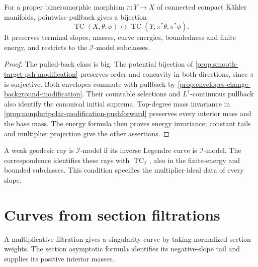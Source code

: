 \begin{proposition}\label{prop:test-curve-modification-invariance}
For a proper bimeromorphic morphism $\pi:Y\to X$ of connected compact K\"ahler manifolds, pointwise pullback gives a bijection
\[
 \operatorname{TC}(X,\theta,\phi)
       \longleftrightarrow
              \operatorname{TC}(Y,\pi^*\theta,\pi^*\phi).
\]
It preserves terminal slopes, masses, curve energies, boundedness and finite energy, and restricts to the $\mathcal I$-model subclasses.
\end{proposition}
\begin{proof}
The pulled-back class is big. The potential bijection of \cref{prop:smooth-target-psh-modification} preserves order and concavity in both directions, since $\pi$ is surjective. Both envelopes commute with pullback by \cref{prop:envelopes-change-background-modification}. Their countable selections and $L^1$-continuous pullback also identify the canonical initial suprema. Top-degree mass invariance in \cref{prop:nonpluripolar-modification-pushforward} preserves every interior mass and the base mass. The energy formula then proves energy invariance; constant tails and multiplier projection give the other assertions.
\end{proof}

\begin{definition}\label{def:i-model-geodesic-ray}
A weak geodesic ray is $\mathcal I$-model if its inverse Legendre curve is $\mathcal I$-model. The correspondence identifies these rays with $\operatorname{TC}_{\mathcal I}$, also in the finite-energy and bounded subclasses. This condition specifies the multiplier-ideal data of every slope.
\end{definition}

\section{Curves from section filtrations}
\label{sec:section-filtration-test-curves}
A multiplicative filtration gives a singularity curve by taking normalized section weights. The section asymptotic formula identifies its negative-slope tail and supplies its positive interior masses.

